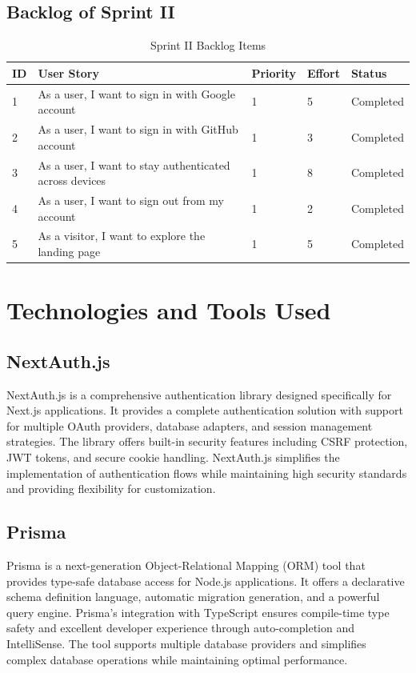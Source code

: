 \subsection{Backlog of Sprint II}
\begin{table}[H]
\centering
\caption{Sprint II Backlog Items}
\label{tab:sprint2_backlog}
\begin{tabular}{|p{1cm}|p{6cm}|p{2cm}|p{2cm}|p{2cm}|}
\hline
\textbf{ID} & \textbf{User Story} & \textbf{Priority} & \textbf{Effort} & \textbf{Status} \\
\hline
1 & As a user, I want to sign in with Google account & 1 & 5 & Completed \\
\hline
2 & As a user, I want to sign in with GitHub account & 1 & 3 & Completed \\
\hline
3 & As a user, I want to stay authenticated across devices & 1 & 8 & Completed \\
\hline
4 & As a user, I want to sign out from my account & 1 & 2 & Completed \\
\hline
5 & As a visitor, I want to explore the landing page & 1 & 5 & Completed \\
\hline
\end{tabular}
\end{table}

\section{Technologies and Tools Used}

\subsection{NextAuth.js}
NextAuth.js is a comprehensive authentication library designed specifically for Next.js applications. It provides a complete authentication solution with support for multiple OAuth providers, database adapters, and session management strategies. The library offers built-in security features including CSRF protection, JWT tokens, and secure cookie handling. NextAuth.js simplifies the implementation of authentication flows while maintaining high security standards and providing flexibility for customization.

\subsection{Prisma}
Prisma is a next-generation Object-Relational Mapping (ORM) tool that provides type-safe database access for Node.js applications. It offers a declarative schema definition language, automatic migration generation, and a powerful query engine. Prisma's integration with TypeScript ensures compile-time type safety and excellent developer experience through auto-completion and IntelliSense. The tool supports multiple database providers and simplifies complex database operations while maintaining optimal performance.

